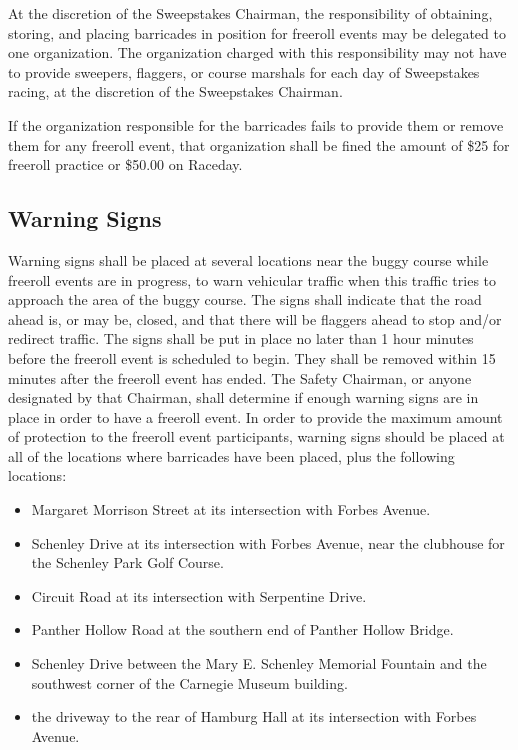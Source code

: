 	At the discretion of the Sweepstakes Chairman, the responsibility of obtaining,
	storing, and placing barricades in position for freeroll events may be
	delegated to one organization. The organization charged with this
	responsibility may not have to provide sweepers, flaggers, or course marshals
	for each day of Sweepstakes racing, at the discretion of the Sweepstakes
	Chairman.

	If the organization responsible for the barricades fails to provide them or
	remove them for any freeroll event, that organization shall be fined
	the amount of \$25 for freeroll practice or \$50.00 on Raceday.

	
\subsection{Warning Signs}

	Warning signs shall be placed at several locations near the buggy course while
	freeroll events are in progress, to warn vehicular traffic when this traffic
	tries to approach the area of the buggy course. The signs shall indicate that
	the road ahead is, or may be, closed, and that there will be flaggers ahead to
	stop and/or redirect traffic. The signs shall be put in place no later than 1 hour
	minutes before the freeroll event is scheduled to begin. They shall be
	removed within 15 minutes after the freeroll event has ended. The Safety
	Chairman, or anyone designated by that Chairman, shall determine if enough
	warning signs are in place in order to have a freeroll event. In order to
	provide the maximum amount of protection to the freeroll event participants,
	warning signs should be placed at all of the locations where barricades have
	been placed, plus the following locations:

	\begin{itemize}
		\item Margaret Morrison Street at its intersection with Forbes Avenue.
		\item Schenley Drive at its intersection with Forbes Avenue, near the clubhouse for the Schenley Park Golf Course.
		\item Circuit Road at its intersection with Serpentine Drive.
		\item Panther Hollow Road at the southern end of Panther Hollow Bridge.
		\item Schenley Drive between the Mary E. Schenley Memorial Fountain and the southwest corner of the Carnegie Museum building.
		\item the driveway to the rear of Hamburg Hall at its intersection with Forbes Avenue.
	\end{itemize}

